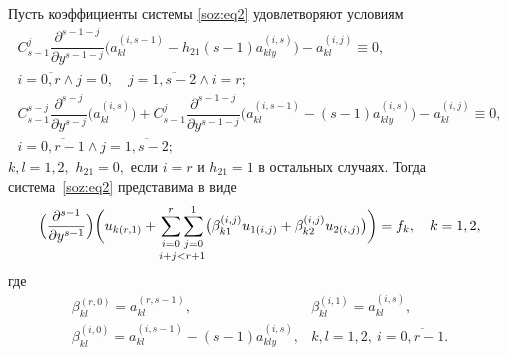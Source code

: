 \medskip
\hypertarget{soz:th5}{}
\begin{theorem}[5]Пусть коэффициенты системы \eqref{soz:eq2}  удовлетворяют условиям
  \begin{equation}
\begin{array}{c}
C_{s-1}^{j}\dfrac{\partial^{s-1-j}}{\partial y^{s-1-j}} \bigl(a_{kl}^{(i,s-1)}-h_{21}(s-1)a_{kly}^{(i,s)} \bigr)-a_{kl}^{(i,j)}\equiv0,
\\[2mm]
i=\overline{0, r}\wedge j=0,\quad j=\overline{1,s-2}\wedge i=r;
\\[4mm]
C_{s-1}^{s-j}\dfrac{\partial^{s-j}}{\partial y^{s-j}}
\bigl(a_{kl}^{(i,s)}\bigr)+
C_{s-1}^{j}\dfrac{\partial^{s-1-j}}{\partial y^{s-1-j}}
\bigl(a_{kl}^{(i,s-1)}-(s-1)a_{kly}^{(i,s)} \bigr)-a_{kl}^{(i,j)}\equiv0,\\[2mm]
i=\overline{0, r-1}\wedge j=\overline{1,s-2};
\end{array}
\label{soz:eq23}
\end{equation}
 $k, l=1, 2,$ 
 $h_{21}=0,$ если $i=r$ и $h_{21}=1$ в остальных случаях$.$ 
 Тогда система~\eqref{soz:eq2}  представима в виде
\begin{equation}
\Bigl(\frac{\partial^{s-1}}{\partial y^{s-1}} \Bigr)\biggl(u_{k(r,1)}+\mathop{\sum\limits_{i=0}^{r}\sum\limits_{j=0}^{1}}\limits_{i + j < r+1} \bigl(\beta_{k1}^{(i,j)}u_{1(i,j)}+\beta_{k2}^{(i,j)}u_{2(i,j)} \bigr)\biggr)=f_{k}, \quad  k=1, 2,
\label{soz:eq24}
\end{equation}
 где
\begin{equation}
\begin{array}{rl }
\beta_{kl}^{(r,0)}=a_{kl}^{(r,s-1)}, &  \beta_{kl}^{(i,1)}=a_{kl}^{(i,s)},\\ \beta_{kl}^{(i,0)}=a_{kl}^{(i,s-1)}-(s-1)a_{kly}^{(i,s)}, & k, l=1, 2,\ i=\overline{0, r-1}.
\end{array}
\label{soz:eq25}
\end{equation}
\end{theorem}
\medskip

